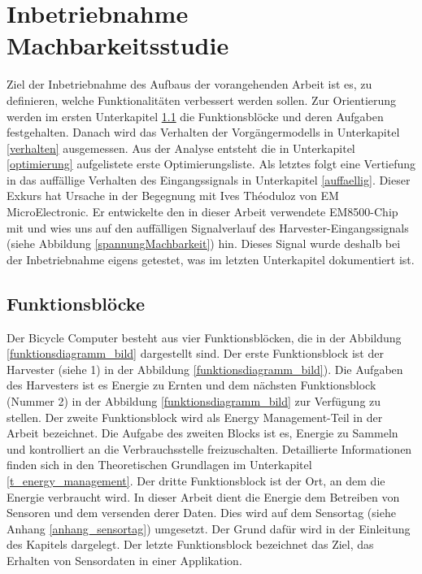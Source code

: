  
\section{Inbetriebnahme Machbarkeitsstudie}\label{v_inbetriebnahme} 

      
Ziel der Inbetriebnahme des Aufbaus der vorangehenden Arbeit \cite{PA_bicycle} ist es, zu definieren, welche Funktionalitäten verbessert werden sollen. Zur Orientierung werden im ersten Unterkapitel \ref{fb} die Funktionsblöcke und deren Aufgaben festgehalten. Danach wird das Verhalten der Vorgängermodells in Unterkapitel \ref{verhalten} ausgemessen. Aus der Analyse entsteht die in Unterkapitel \ref{optimierung} aufgelistete erste Optimierungsliste. Als letztes folgt eine Vertiefung in das auffällige Verhalten des Eingangssignals in Unterkapitel \ref{auffaellig}. Dieser Exkurs hat Ursache in der Begegnung mit  Ives Théoduloz von EM MicroElectronic. Er entwickelte den in dieser Arbeit verwendete EM8500-Chip mit und wies uns auf den auffälligen Signalverlauf des Harvester-Eingangssignals (siehe Abbildung \ref{spannungMachbarkeit}) hin. Dieses Signal wurde deshalb bei der Inbetriebnahme eigens getestet, was im letzten Unterkapitel dokumentiert ist.
      
\subsection{Funktionsblöcke}\label{fb} 

Der Bicycle Computer besteht aus vier Funktionsblöcken, die in der Abbildung \ref{funktionsdiagramm_bild} dargestellt sind. Der erste Funktionsblock ist der Harvester (siehe 1) in der Abbildung \ref{funktionsdiagramm_bild}). Die Aufgaben des Harvesters ist es Energie zu Ernten und dem nächsten Funktionsblock (Nummer 2) in der Abbildung  \ref{funktionsdiagramm_bild} zur Verfügung zu stellen. Der zweite Funktionsblock wird als Energy Management-Teil in der Arbeit bezeichnet. Die Aufgabe des zweiten Blocks ist es, Energie zu Sammeln und kontrolliert an die Verbrauchsstelle freizuschalten. Detaillierte Informationen finden sich in den Theoretischen Grundlagen im Unterkapitel \ref{t_energy_management}. Der dritte Funktionsblock ist der Ort, an dem die Energie verbraucht wird. In dieser Arbeit dient die Energie dem Betreiben von Sensoren und dem versenden derer Daten. Dies wird auf dem Sensortag (siehe Anhang \ref{anhang_sensortag}) umgesetzt. Der Grund dafür wird in der Einleitung des Kapitels \label{t_power_management} dargelegt. Der letzte Funktionsblock bezeichnet das Ziel, das Erhalten von Sensordaten in einer Applikation.  

